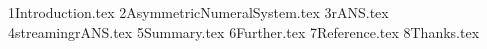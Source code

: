 \documentclass[aspectratio=\BeamerAspectRatio]{beamer}
\begin{document}
\maketitlepage %


\maketableofcontents %

\makesectionpopup


{1Introduction.tex}
{2AsymmetricNumeralSystem.tex}
{3rANS.tex}
{4streamingrANS.tex}
{5Summary.tex}
{6Further.tex}
{7Reference.tex}
{8Thanks.tex}
\end{document}

